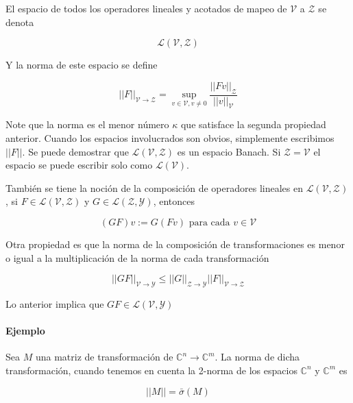 El espacio de todos los operadores lineales y acotados de mapeo de $\mathcal{V}$ a $\mathcal{Z}$ se denota

\begin{equation*}
    \mathcal{L}(\mathcal{V},\mathcal{Z})
\end{equation*}

Y la norma de este espacio se define 

\begin{equation*}
    ||F||_{\mathcal{V} \to \mathcal{Z}} = \sup_{v \in \mathcal{V},v \neq 0} \frac{||Fv||_{\mathcal{Z}}}{||v||_\mathcal{V}}
\end{equation*}


Note que la norma es el menor número $\kappa$ que satisface la segunda propiedad anterior. Cuando los espacios involucrados son obvios, simplemente escribimos $||F||$. Se puede demostrar que $\mathcal{L}(\mathcal{V},\mathcal{Z})$ es un espacio Banach. Si $\mathcal{Z}=\mathcal{V}$ el espacio se puede escribir solo como $\mathcal{L}(\mathcal{V})$. 

También se tiene la noción de la composición de operadores lineales en $\mathcal{L}(\mathcal{V},\mathcal{Z})$, si $F \in \mathcal{L}(\mathcal{V},\mathcal{Z})$ y $G \in \mathcal{L}(\mathcal{Z},\mathcal{Y})$, entonces

\begin{equation*}
    (GF)v := G(Fv) \text{ para cada } v \in \mathcal{V}
\end{equation*}

Otra propiedad es que la norma de la composición de transformaciones es menor o igual a la multiplicación de la norma de cada transformación 

\begin{equation*}
    ||GF||_{\mathcal{V} \to \mathcal{Y}} \leq ||G||_{\mathcal{Z} \to \mathcal{Y}} ||F||_{\mathcal{V} \to \mathcal{Z}}
\end{equation*}

Lo anterior implica que $ GF \in \mathcal{L}(\mathcal{V},\mathcal{Y})$

\paragraph{Ejemplo}

Sea $M$ una matriz de transformación de $\mathbb{C}^{n} \to \mathbb{C}^m$. La norma de dicha transformación, cuando tenemos en cuenta la 2-norma de los espacios $\mathbb{C}^n$ y $\mathbb{C}^m$ es

\begin{equation*}
    ||M|| = \bar{\sigma}(M)
\end{equation*}


